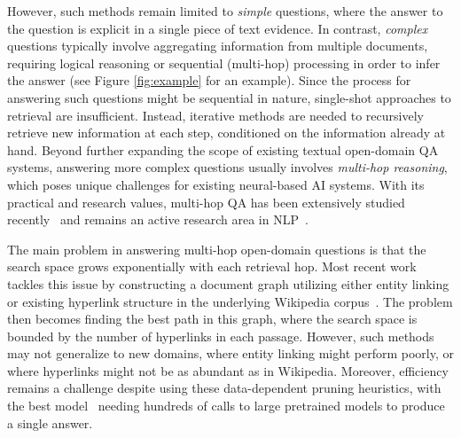 \documentclass{article} \usepackage{iclr2021_conference,times}
\begin{document}
However, such methods remain limited to \emph{simple} questions, where the answer to the question is explicit in a single piece of text evidence. In contrast, \emph{complex} questions typically involve aggregating information from multiple documents, requiring logical reasoning or sequential (multi-hop) processing in order to infer the answer (see Figure \ref{fig:example} for an example). Since the process for answering such questions might be sequential in nature, single-shot approaches to retrieval are insufficient. Instead, iterative methods are needed to recursively retrieve new information at each step, conditioned on the information already at hand.
Beyond further expanding the scope of existing textual open-domain QA systems, answering more complex questions usually involves \textit{multi-hop reasoning}, which poses unique challenges for existing neural-based AI systems. With its practical and research values,
multi-hop QA has been extensively studied recently~\citep{ComplexWebQ,HotpotQA,Wikihop} and remains an active research area in NLP~\citep{GoldEn,SMR,DecomQA,Transformer-XH,GraphRecurrentRetriever,UQD}.

The main problem in answering multi-hop open-domain questions is that the search space grows exponentially with each retrieval hop. Most recent work tackles this issue by constructing a document graph utilizing either entity linking or existing hyperlink structure in the underlying Wikipedia corpus~\citep{SMR,GraphRecurrentRetriever}. The problem then becomes finding the best path in this graph, where the search space is bounded by the number of hyperlinks in each passage. However, such methods may not generalize to new domains, where entity linking might perform poorly, or where hyperlinks might not be as abundant as in Wikipedia. Moreover, efficiency remains a challenge despite using these data-dependent pruning heuristics, with the best model~\citep{GraphRecurrentRetriever} needing hundreds of calls to large pretrained models to produce a single answer.  
\end{document}

